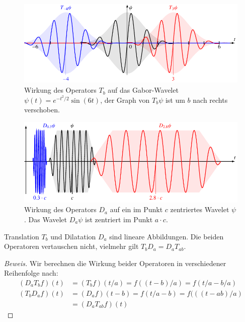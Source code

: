 \begin{figure}
\centering
\includegraphics[width=\hsize]{chapters/1-geometrie/images/translation.pdf}
\caption{Wirkung des Operators $T_b$ auf das Gabor-Wavelet
$\psi(t) = e^{-t^2/2}\sin(6t)$,
der Graph von $T_b\psi$ ist um $b$ nach rechts verschoben.
\label{geometrie:Tb:image}}
\end{figure}
\begin{figure}
\centering
\includegraphics[width=\hsize]{chapters/1-geometrie/images/dilatation.pdf}
\caption{Wirkung des Operators $D_a$ auf ein im Punkt $c$ zentriertes
Wavelet $\psi$. Das Wavelet $D_a\psi$ ist zentriert im Punkt $a\cdot c$.
\label{geometrie:Da:image}}
\end{figure}


\begin{satz}
Translation $T_b$ und Dilatation $D_a$ sind lineare Abbildungen.
Die beiden Operatoren vertauschen nicht, vielmehr gilt
$T_bD_a = D_aT_{ab}$.
\end{satz}

\begin{proof}[Beweis]

Wir berechnen die Wirkung beider Operatoren in verschiedener Reihenfolge
nach:
\begin{align*}
(D_aT_bf)(t)
&=
(T_bf)(t/a)
=
f((t-b)/a) = f(t/a - b/a)
\\
(T_bD_a f)(t)
&=
(D_af)(t - b)
=
f(t/a - b)
=
f(((t-ab)/a)
\\
&=
(D_aT_{ab}f)(t)
\end{align*}
\end{proof}

